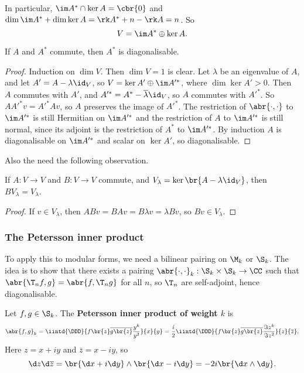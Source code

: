 In particular, $ \im A^* \cap \ker A = \cbr{0} $ and $ \dim \im A^* + \dim \ker A = \rk A^* + n - \rk A = n $. So
$$ V = \im A^* \oplus \ker A. $$

\begin{theorem}
If $ A $ and $ A^* $ commute, then $ A^* $ is diagonalisable.
\end{theorem}

\begin{proof}
Induction on $ \dim V $. Then $ \dim V = 1 $ is clear. Let $ \lambda $ be an eigenvalue of $ A $, and let $ A' = A - \lambda\id_V $, so $ V = \ker A' \oplus \im A'^* $, where $ \dim \ker A' > 0 $. Then $ A $ commutes with $ A' $, and $ A'^* = A^* - \overline{\lambda}\id_V $, so $ A $ commutes with $ A'^* $. So $ AA'^*v = A'^*Av $, so $ A $ preserves the image of $ A'^* $. The restriction of $ \abr{\cdot, \cdot} $ to $ \im A'^* $ is still Hermitian on $ \im A'^* $ and the restriction of $ A $ to $ \im A'^* $ is still normal, since its adjoint is the restriction of $ A^* $ to $ \im A'^* $. By induction $ A $ is diagonalisable on $ \im A'^* $ and scalar on $ \ker A' $, so diagonalisable.
\end{proof}

Also the need the following observation.

\begin{proposition}
If $ A : V \to V $ and $ B : V \to V $ commute, and $ V_\lambda = \ker \br{A - \lambda\id_V} $, then $ BV_\lambda = V_\lambda $.
\end{proposition}

\begin{proof}
If $ v \in V_\lambda $, then $ ABv = BAv = B\lambda v = \lambda Bv $, so $ Bv \in V_\lambda $.
\end{proof}

\pagebreak

\subsubsection{The Petersson inner product}

To apply this to modular forms, we need a bilinear pairing on $ \M_k $ or $ \S_k $. The idea is to show that there exists a pairing $ \abr{\cdot, \cdot}_k : \S_k \times \S_k \to \CC $ such that $ \abr{\T_nf, g} = \abr{f, \T_ng} $ for all $ n $, so $ \T_n $ are self-adjoint, hence diagonalisable.

\begin{definition}
Let $ f, g \in \S_k $. The \textbf{Petersson inner product of weight $ k $} is
$$ \abr{f, g}_k = \iintd{\DDD}{f\br{z}\overline{g\br{z}}\dfrac{y^k}{y^2}}{x}{y} = \dfrac{i}{2}\iintd{\DDD}{f\br{z}\overline{g\br{z}}\dfrac{\Im z^k}{\Im z^2}}{z}{\overline{z}}. $$
Here $ z = x + iy $ and $ \overline{z} = x - iy $, so
$$ \d z\d\overline{z} = \br{\d x + i\d y} \wedge \br{\d x - i\d y} = -2i\br{\d x \wedge \d y}. $$
\end{definition}

